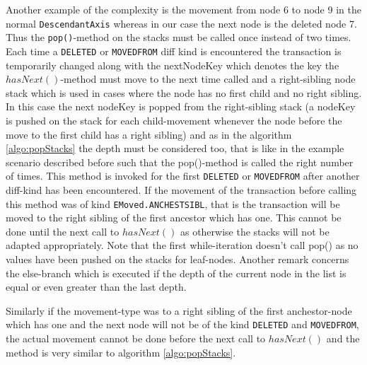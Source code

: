 Another example of the complexity is the movement from node 6 to node 9 in the normal \texttt{DescendantAxis} whereas in our case the next node is the deleted node 7. Thus the \texttt{pop()}-method on the stacks must be called once instead of two times. Each time a \texttt{DELETED} or \texttt{MOVEDFROM} diff kind is encountered the transaction is temporarily changed along with the nextNodeKey which denotes the key the $hasNext()$-method must move to the next time called and a right-sibling node stack which is used in cases where the node has no first child and no right sibling. In this case the next nodeKey is popped from the right-sibling stack (a nodeKey is pushed on the stack for each child-movement whenever the node before the move to the first child has a right sibling) and as in the algorithm \ref{algo:popStacks} the depth must be considered too, that is like in the example scenario described before such that the pop()-method is called the right number of times. This method is invoked for the first \texttt{DELETED} or \texttt{MOVEDFROM} after another diff-kind has been encountered. If the movement of the transaction before calling this method was of kind \texttt{EMoved.ANCHESTSIBL}, that is the transaction will be moved to the right sibling of the first ancestor which has one. This cannot be done until the next call to $hasNext()$ as otherwise the stacks will not be adapted appropriately. Note that the first while-iteration doesn't call pop() as no values have been pushed on the stacks for leaf-nodes. Another remark concerns the else-branch which is executed if the depth of the current node in the list is equal or even greater than the last depth.

Similarly if the movement-type was to a right sibling of the first anchestor-node which has one and the next node will not be of the kind \texttt{DELETED} and \texttt{MOVEDFROM}, the actual movement cannot be done before the next call to $hasNext()$ and the method is very similar to algorithm \ref{algo:popStacks}.

